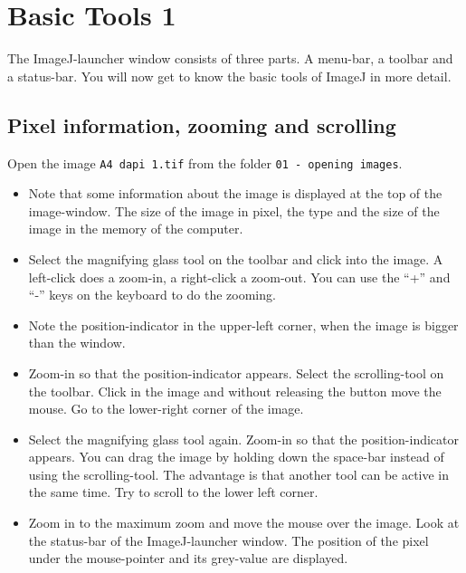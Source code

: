 \chapter{Basic Tools 1}

The ImageJ-launcher window consists of three parts. A menu-bar, a toolbar and a status-bar. You
will now get to know the basic tools of ImageJ in more detail.

\section{Pixel information, zooming and scrolling}

Open the image \texttt{A4 dapi 1.tif} from the folder \texttt{01 - opening images}.

\begin{itemize}
\item Note that some information about the image is displayed at the top of the image-window. The size of the image in pixel, the type and the size of the image in the memory of the computer.
\item Select the magnifying glass tool on the toolbar and click into the image. A left-click does a zoom-in, a right-click a zoom-out. You can use the ``+'' and ``-'' keys on the keyboard to do the zooming.
\item Note the position-indicator in the upper-left corner, when the image is bigger than the window.
\item Zoom-in so that the position-indicator appears. Select the scrolling-tool on the toolbar. Click in the image and without releasing the button move the mouse. Go to the lower-right corner of the image.
\item Select the magnifying glass tool again. Zoom-in so that the position-indicator appears. You can drag the image by holding down the space-bar instead of using the scrolling-tool. The advantage is that another tool can be active in the same time. Try to scroll to the lower left corner.
\item Zoom in to the maximum zoom and move the mouse over the image. Look at the status-bar of the ImageJ-launcher window. The position of the pixel under the mouse-pointer and its grey-value are displayed.
\end{itemize}

